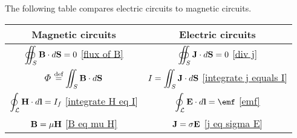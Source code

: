     The following table compares electric circuits to magnetic circuits.
    \begin{center}
        \begin{tabular}{ c|c } 
            Magnetic circuits & Electric circuits \\
            \hline
            \rule[-3ex]{0pt}{0pt}\rule{0pt}{4ex}
            $\displaystyle\oiint_S \mathbf{B}\cdot d\mathbf{S} = 0$ \eqref{flux of B} & 
            $\displaystyle\oiint_S \mathbf{J}\cdot d\mathbf{S} = 0$ \eqref{div j}\\

            \rule[-3ex]{0pt}{0pt}\rule{0pt}{4ex}
            \Large$\Phi$ \normalsize$\displaystyle\stackrel{\text{def}}{=} \iint_S \mathbf{B}\cdot d\mathbf{S}$  & 
            $\displaystyle I = \iint_S \mathbf{J}\cdot d\mathbf{S}$ \eqref{integrate j equals I} \\

            \rule[-3ex]{0pt}{0pt}\rule{0pt}{4ex}
            $\displaystyle\oint_\mathcal{L}\mathbf{H}\cdot d\mathbf{l} = I_f$ \eqref{integrate H eq I} & 
            $\displaystyle\oint_\mathcal{L}\E\cdot d\vec{l} = \emf$ \eqref{emf} \\

            \rule[-3ex]{0pt}{0pt}\rule{0pt}{4ex}
            $\displaystyle\mathbf{B} = \mu\mathbf{H}$ \eqref{B eq mu H} & 
            $\displaystyle\mathbf{J} = \sigma\mathbf{E}$ \eqref{j eq sigma E} \\
        \end{tabular}
    \end{center}